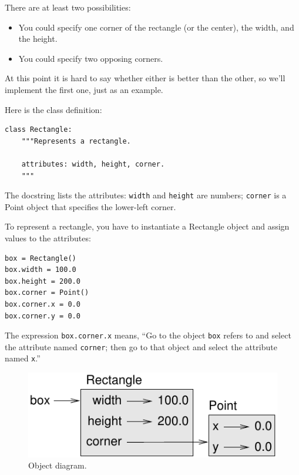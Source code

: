 \documentclass[10pt]{book}
\begin{document}
There are at least two possibilities: 

\begin{itemize}

\item You could specify one corner of the rectangle
(or the center), the width, and the height.

\item You could specify two opposing corners.

\end{itemize}

At this point it is hard to say whether either is better than
the other, so we'll implement the first one, just as an example.

Here is the class definition:

\begin{verbatim}
class Rectangle:
    """Represents a rectangle. 

    attributes: width, height, corner.
    """
\end{verbatim}
%
The docstring lists the attributes:  {\tt width} and
{\tt height} are numbers; {\tt corner} is a Point object that
specifies the lower-left corner.

To represent a rectangle, you have to instantiate a Rectangle
object and assign values to the attributes:

\begin{verbatim}
box = Rectangle()
box.width = 100.0
box.height = 200.0
box.corner = Point()
box.corner.x = 0.0
box.corner.y = 0.0
\end{verbatim}
%
The expression {\tt box.corner.x} means,
``Go to the object {\tt box} refers to and select the attribute named
{\tt corner}; then go to that object and select the attribute named
{\tt x}.''

\begin{figure}
\centerline
{\includegraphics[scale=0.8]{figs/rectangle.pdf}}
\caption{Object diagram.}
\label{fig.rectangle}
\end{figure}
\end{document}
